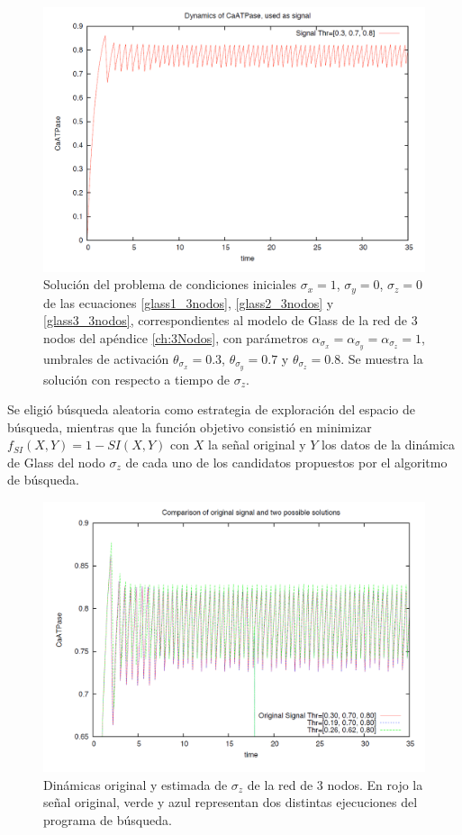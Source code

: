 \begin{figure}[hbt]
\includegraphics[width=0.9\linewidth]{gfx/original3Nodos}
\caption[Dinámica original $\sigma_z$]{Solución del problema de condiciones iniciales $\sigma_x = 1$, $\sigma_y = 0$, $\sigma_z = 0$ de las ecuaciones \ref{glass1_3nodos}, \ref{glass2_3nodos} y \ref{glass3_3nodos}, correspondientes al modelo de Glass de la red de 3 nodos del apéndice \ref{ch:3Nodos}, con parámetros $\alpha_{\sigma_x} = \alpha_{\sigma_y} = \alpha_{\sigma_z} = 1$, umbrales de activación $\theta_{\sigma_x} = 0.3$, $\theta_{\sigma_y} = 0.7$ y $\theta_{\sigma_z} = 0.8$. Se muestra la solución con respecto a tiempo de $\sigma_z$.}\label{fig:signal3nodos}
\end{figure}

Se eligió búsqueda aleatoria como estrategia de exploración del espacio de búsqueda, mientras que la función objetivo consistió en minimizar $f_{SI}(X,Y) = 1 -SI(X,Y)$ con $X$ la señal original y $Y$ los datos de la dinámica de Glass del nodo $\sigma_z$ de cada uno de los candidatos propuestos por el algoritmo de búsqueda.

\begin{figure}[hbt]
\includegraphics[width=0.9\linewidth]{gfx/comparacion3Nodos}
\caption[Dinámicas original y estimada $\sigma_z$]{Dinámicas original y estimada de $\sigma_z$ de la red de 3 nodos. En rojo la señal original, verde y azul representan dos distintas ejecuciones del programa de búsqueda.}\label{fig:resultadoChido3Nodos}
\end{figure}

